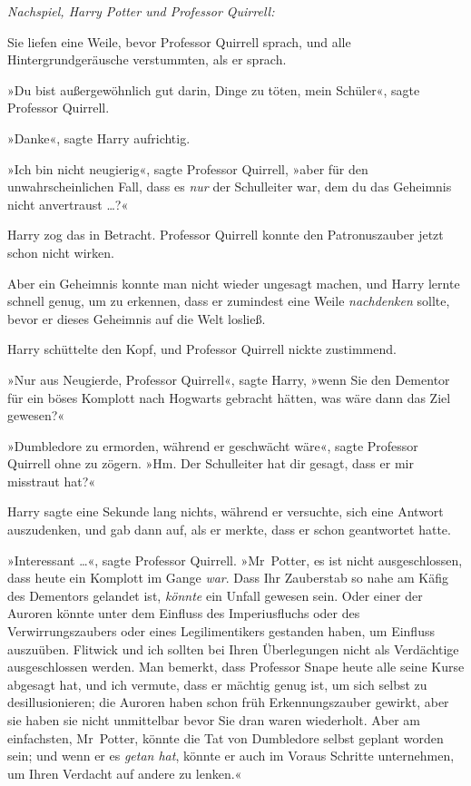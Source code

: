 {\emph{Nachspiel, Harry Potter und Professor Quirrell:}

Sie liefen eine Weile, bevor Professor Quirrell sprach, und alle Hintergrundgeräusche verstummten, als er sprach.

»Du bist außergewöhnlich gut darin, Dinge zu töten, mein Schüler«, sagte Professor Quirrell.

»Danke«, sagte Harry aufrichtig.

»Ich bin nicht neugierig«, sagte Professor Quirrell, »aber für den unwahrscheinlichen Fall, dass es \emph{nur} der Schulleiter war, dem du das Geheimnis nicht anvertraust …?«

Harry zog das in Betracht. Professor Quirrell konnte den Patronuszauber jetzt schon nicht wirken.

Aber ein Geheimnis konnte man nicht wieder ungesagt machen, und Harry lernte schnell genug, um zu erkennen, dass er zumindest eine Weile \emph{nachdenken} sollte, bevor er dieses Geheimnis auf die Welt losließ.

Harry schüttelte den Kopf, und Professor Quirrell nickte zustimmend.

»Nur aus Neugierde, Professor Quirrell«, sagte Harry, »wenn Sie den Dementor für ein böses Komplott nach Hogwarts gebracht hätten, was wäre dann das Ziel gewesen?«

»Dumbledore zu ermorden, während er geschwächt wäre«, sagte Professor Quirrell ohne zu zögern. »Hm. Der Schulleiter hat dir gesagt, dass er mir misstraut hat?«

Harry sagte eine Sekunde lang nichts, während er versuchte, sich eine Antwort auszudenken, und gab dann auf, als er merkte, dass er schon geantwortet hatte.

»Interessant …«, sagte Professor Quirrell. »Mr~Potter, es ist nicht ausgeschlossen, dass heute ein Komplott im Gange \emph{war}. Dass Ihr Zauberstab so nahe am Käfig des Dementors gelandet ist, \emph{könnte} ein Unfall gewesen sein. Oder einer der Auroren könnte unter dem Einfluss des Imperiusfluchs oder des Verwirrungszaubers oder eines Legilimentikers gestanden haben, um Einfluss auszuüben. Flitwick und ich sollten bei Ihren Überlegungen nicht als Verdächtige ausgeschlossen werden. Man bemerkt, dass Professor Snape heute alle seine Kurse abgesagt hat, und ich vermute, dass er mächtig genug ist, um sich selbst zu desillusionieren; die Auroren haben schon früh Erkennungszauber gewirkt, aber sie haben sie nicht unmittelbar bevor Sie dran waren wiederholt. Aber am einfachsten, Mr~Potter, könnte die Tat von Dumbledore selbst geplant worden sein; und wenn er es \emph{getan hat}, könnte er auch im Voraus Schritte unternehmen, um Ihren Verdacht auf andere zu lenken.«

}
